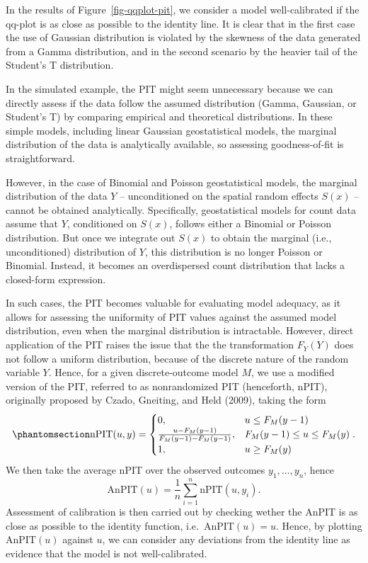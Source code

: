 \documentclass[
  letterpaper,
]{krantz}
\begin{document}
In the results of Figure~\ref{fig-qqplot-pit}, we consider a model
well-calibrated if the qq-plot is as close as possible to the identity
line. It is clear that in the first case the use of Gaussian
distribution is violated by the skewness of the data generated from a
Gamma distribution, and in the second scenario by the heavier tail of
the Student's T distribution.

In the simulated example, the PIT might seem unnecessary because we can
directly assess if the data follow the assumed distribution (Gamma,
Gaussian, or Student's T) by comparing empirical and theoretical
distributions. In these simple models, including linear Gaussian
geostatistical models, the marginal distribution of the data is
analytically available, so assessing goodness-of-fit is straightforward.

However, in the case of Binomial and Poisson geostatistical models, the
marginal distribution of the data \(Y\) -- unconditioned on the spatial
random effects \(S(x)\) -- cannot be obtained analytically.
Specifically, geostatistical models for count data assume that \(Y\),
conditioned on \(S(x)\), follows either a Binomial or Poisson
distribution. But once we integrate out \(S(x)\) to obtain the marginal
(i.e., unconditioned) distribution of \(Y\), this distribution is no
longer Poisson or Binomial. Instead, it becomes an overdispersed count
distribution that lacks a closed-form expression.

In such cases, the PIT becomes valuable for evaluating model adequacy,
as it allows for assessing the uniformity of PIT values against the
assumed model distribution, even when the marginal distribution is
intractable. However, direct application of the PIT raises the issue
that the the transformation \(F_{Y}(Y)\) does not follow a uniform
distribution, because of the discrete nature of the random variable
\(Y\). Hence, for a given discrete-outcome model \(M\), we use a
modified version of the PIT, referred to as nonrandomized PIT
(henceforth, nPIT), originally proposed by Czado, Gneiting, and Held
(2009), taking the form \begin{equation}\phantomsection\label{eq-anpit}{
\text{nPIT}(u,y) = 
\begin{cases} 
0, & u \leq F_{M}(y-1) \\ 
\frac{u - F_{M}(y-1)}{F_{M}(y-1) - F_{M}(y-1)}, & F_{M}(y-1) \leq u \leq F_{M}(y) \\ 
1, & u \geq F_{M}(y)
\end{cases}.
}\end{equation} We then take the average nPIT over the observed outcomes
\(y_{1}, \ldots, y_{n}\), hence \[
\text{AnPIT}(u) = \frac{1}{n} \sum_{i=1}^n \text{nPIT}(u, y_{i}). 
\] Assessment of calibration is then carried out by checking wether the
AnPIT is as close as possible to the identity function,
i.e.~\(\text{AnPIT}(u) = u\). Hence, by plotting \(\text{AnPIT}(u)\)
against \(u\), we can consider any deviations from the identity line as
evidence that the model is not well-calibrated.
\end{document}
